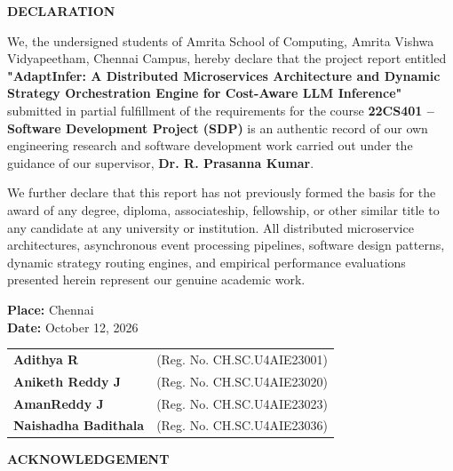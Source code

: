 \documentclass[12pt,a4paper]{report}
\begin{document}
\newpage
\thispagestyle{empty}
\begin{center}
    {\large \textbf{DECLARATION}\par}
    \vspace{1.0cm}
\end{center}

We, the undersigned students of Amrita School of Computing, Amrita Vishwa Vidyapeetham, Chennai Campus, hereby declare that the project report entitled \textbf{"AdaptInfer: A Distributed Microservices Architecture and Dynamic Strategy Orchestration Engine for Cost-Aware LLM Inference"} submitted in partial fulfillment of the requirements for the course \textbf{22CS401 – Software Development Project (SDP)} is an authentic record of our own engineering research and software development work carried out under the guidance of our supervisor, \textbf{Dr. R. Prasanna Kumar}.

We further declare that this report has not previously formed the basis for the award of any degree, diploma, associateship, fellowship, or other similar title to any candidate at any university or institution. All distributed microservice architectures, asynchronous event processing pipelines, software design patterns, dynamic strategy routing engines, and empirical performance evaluations presented herein represent our genuine academic work.

\vspace{2.0cm}

\noindent
\textbf{Place:} Chennai \\
\textbf{Date:} October 12, 2026

\vspace{1.5cm}

\noindent
\begin{tabular}{@{}ll@{}}
\textbf{Adithya R} & (Reg. No. CH.SC.U4AIE23001) \\[0.6cm]
\textbf{Aniketh Reddy J} & (Reg. No. CH.SC.U4AIE23020) \\[0.6cm]
\textbf{AmanReddy J} & (Reg. No. CH.SC.U4AIE23023) \\[0.6cm]
\textbf{Naishadha Badithala} & (Reg. No. CH.SC.U4AIE23036)
\end{tabular}

\newpage
\thispagestyle{empty}
\begin{center}
    {\large \textbf{ACKNOWLEDGEMENT}\par}
    \vspace{1.0cm}
\end{center}
\end{document}
